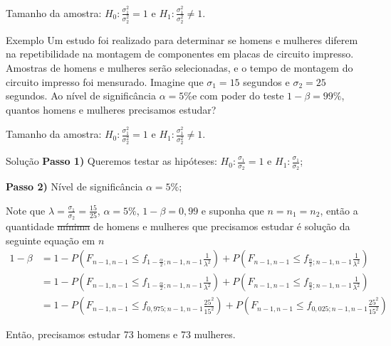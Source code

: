 \documentclass[9pt]{beamer}
\begin{document}
\begin{frame}{Tamanho da amostra: $H_0:\frac{\sigma_1^2}{\sigma_2^2} = 1$ e $H_1:\frac{\sigma_1^2}{\sigma_2^2} \neq 1$.}

\large

\begin{block}{Exemplo}
	Um estudo foi realizado para determinar se homens e mulheres diferem na repetibilidade na montagem de componentes em placas de circuito impresso. Amostras de homens e mulheres serão selecionadas, e o tempo de montagem do circuito impresso foi mensurado. 
	Imagine que $\sigma_1=15$ segundos e $\sigma_2=25$ segundos. Ao nível de significância $\alpha=5\%$e com poder do teste $1-\beta=99\%$, quantos homens e mulheres precisamos estudar?
\end{block}

\normalsize

\end{frame}


\begin{frame}{Tamanho da amostra: $H_0:\frac{\sigma_1^2}{\sigma_2^2} = 1$ e $H_1:\frac{\sigma_1^2}{\sigma_2^2} \neq 1$.}

\small

\begin{block}{Solução}
	\textbf{Passo 1)} Queremos testar as hipóteses: $H_0: \frac{\sigma_1}{\sigma_2} = 1$ e $H_1: \frac{\sigma_1}{\sigma_2}$;
	
	\textbf{Passo 2)} Nível de significância $\alpha=5\%$;
	
		
	Note que $\lambda = \frac{\sigma_1}{\sigma_2} = \frac{15}{25}$, $\alpha=5\%$, $1-\beta=0,99$ e suponha que $n=n_1=n_2$, então a quantidade \sout{mínima} de homens e mulheres que precisamos estudar é solução da seguinte equação em $n$
	\begin{align*}
		1-\beta &= 1 - P\left( F_{n-1, n-1} \leq f_{1-\frac{\alpha}{2};n-1, n-1} \frac{1}{\lambda^2} \right) + P\left( F_{n-1, n-1} \leq f_{\frac{\alpha}{2};n-1, n-1} \frac{1}{\lambda^2} \right)\\
		&= 1 - P\left( F_{n-1, n-1} \leq f_{1-\frac{\alpha}{2};n-1, n-1} \frac{1}{\lambda^2} \right) + P\left( F_{n-1, n-1} \leq f_{\frac{\alpha}{2};n-1, n-1} \frac{1}{\lambda^2} \right) \\
		&= 1 - P\left( F_{n-1, n-1} \leq f_{0,975;n-1, n-1} \frac{25^2}{15^2} \right) + P\left( F_{n-1, n-1} \leq f_{0,025;n-1, n-1} \frac{25^2}{15^2} \right)
	\end{align*}
\end{block}

Então, precisamos estudar 73 homens e 73 mulheres.

\normalsize

\end{frame}
\end{document}
